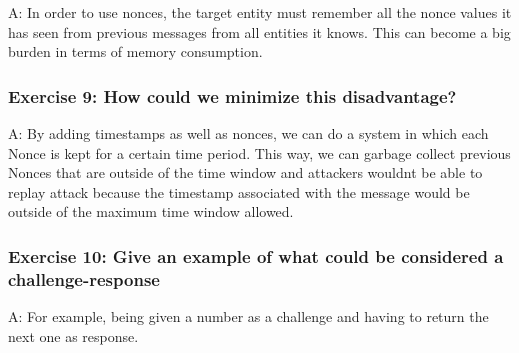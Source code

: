 \documentclass[12pt,a4paper]{article}
\begin{document}
A: In order to use nonces, the target entity must remember all the nonce values it has seen from previous messages from all entities it knows. This can become a big burden in terms of memory consumption.

\subsubsection*{Exercise 9: How could we minimize this disadvantage?}

A: By adding timestamps as well as nonces, we can do a system in which each Nonce is kept for a certain time period. This way, we can garbage collect previous Nonces that are outside of the time window and attackers wouldnt be able to replay attack because the timestamp associated with the message would be outside of the maximum time window allowed.

\subsubsection*{Exercise 10: Give an example of what could be considered a challenge-response}

A: For example, being given a number as a challenge and having to return the next one as response. 
\end{document}
